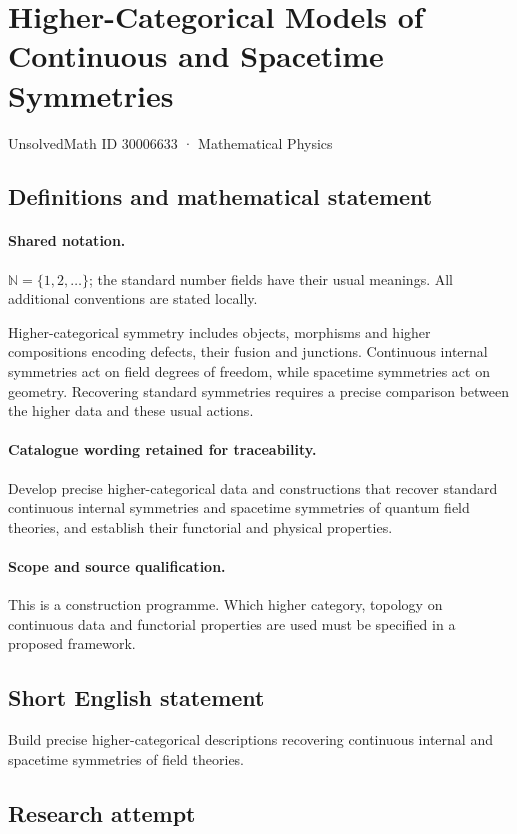 \documentclass[11pt]{article}
\begin{document}
\setcounter{section}{30006632}
\section{Higher-Categorical Models of Continuous and Spacetime Symmetries}\label{30006633}
{\small UnsolvedMath ID 30006633 · Mathematical Physics}
\subsection{Definitions and mathematical statement}

\paragraph{Shared notation.}$\mathbb N=\{1,2,\ldots\}$; the standard number fields have their usual meanings. All additional conventions are stated locally.


Higher-categorical symmetry includes objects, morphisms and higher compositions encoding defects, their fusion and junctions. Continuous internal symmetries act on field degrees of freedom, while spacetime symmetries act on geometry. Recovering standard symmetries requires a precise comparison between the higher data and these usual actions.

\paragraph{Catalogue wording retained for traceability.}
Develop precise higher-categorical data and constructions that recover standard continuous internal symmetries and spacetime symmetries of quantum field theories, and establish their functorial and physical properties.

\paragraph{Scope and source qualification.}This is a construction programme. Which higher category, topology on continuous data and functorial properties are used must be specified in a proposed framework.
\subsection{Short English statement}
Build precise higher-categorical descriptions recovering continuous internal and spacetime symmetries of field theories.
\subsection{Research attempt}
\end{document}
